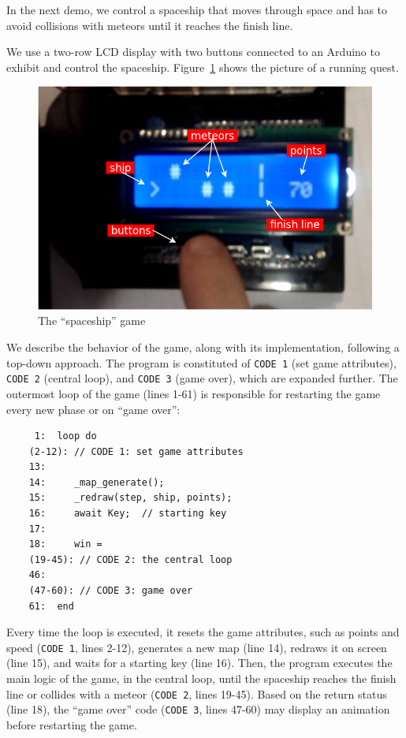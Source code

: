\documentclass{sig-alternate}
\newcommand{\2}{\;\;}
\newcommand{\5}{\;\;\;\;\;}
\newcommand{\code}[1] {{\small{\texttt{#1}}}}
\begin{document}
In the next demo, we control a spaceship that moves through space and has to 
avoid collisions with meteors until it reaches the finish line.

We use a two-row LCD display with two buttons connected to an Arduino to 
exhibit and control the spaceship.
Figure~\ref{fig:ship} shows the picture of a running quest.

\begin{figure}[t]
\centering
\includegraphics[scale=0.30]{ship.png}
\caption{ The ``spaceship'' game
\label{fig:ship}
}
\end{figure}

We describe the behavior of the game, along with its implementation, following 
a top-down approach.
The program is constituted of \code{CODE~1} (set game attributes), 
\code{CODE~2} (central loop), and \code{CODE~3} (game over), which are expanded 
further.
The outermost loop of the game (lines 1-61) is responsible for restarting the 
game every new phase or on ``game over'':

\newpage

{\small
\begin{verbatim}
     1:  loop do
    (2-12): // CODE 1: set game attributes
    13:
    14:     _map_generate();
    15:     _redraw(step, ship, points);
    16:     await Key;  // starting key
    17:
    18:     win =
    (19-45): // CODE 2: the central loop
    46:
    (47-60): // CODE 3: game over
    61:  end
\end{verbatim}
}

Every time the loop is executed, it resets the game attributes, such as points 
and speed (\code{CODE 1}, lines 2-12), generates a new map (line 14), redraws 
it on screen (line 15), and waits for a starting key (line 16).
Then, the program executes the main logic of the game, in the central loop, 
until the spaceship reaches the finish line or collides with a meteor 
(\code{CODE 2}, lines 19-45).
Based on the return status (line 18), the ``game over'' code (\code{CODE 3}, 
lines 47-60) may display an animation before restarting the game.
\end{document}
